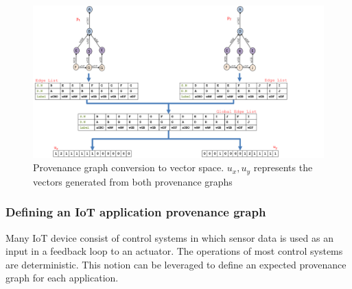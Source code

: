 \begin{figure}
\begin{center}
\includegraphics[width=\textwidth]{vector6.pdf}
\end{center}
\caption{Provenance graph conversion to vector space. $u_x, u_y$ represents the vectors generated from both provenance graphs}
\label{prov_vector}
\end{figure}


\subsubsection{Defining an IoT application provenance graph}
Many IoT device consist of control systems in which sensor data is used as an input in a feedback loop to an actuator. The operations of most control systems are deterministic. This notion can be leveraged to define an expected provenance graph for each application. 


